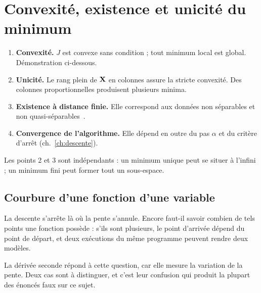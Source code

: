 \chapter{Convexité, existence et unicité du minimum}
\label{ann:convexite}


\begin{resultat}
\begin{enumerate}
  \item \textbf{Convexité.} $J$ est convexe sans condition ; tout minimum local
        est global. Démonstration ci-dessous.
  \item \textbf{Unicité.} Le rang plein de $\mathbf{X}$ en colonnes assure la stricte
        convexité. Des colonnes proportionnelles produisent plusieurs minima.
  \item \textbf{Existence à distance finie.} Elle correspond aux données
        non séparables et non quasi-séparables~\cite{albert1984}.
  \item \textbf{Convergence de l'algorithme.} Elle dépend en outre du pas
        $\alpha$ et du critère d'arrêt (ch.~\ref{ch:descente}).
\end{enumerate}
Les points 2 et 3 sont indépendants : un minimum unique peut se situer à
l'infini ; un minimum fini peut former tout un sous-espace.
\end{resultat}

\section{Courbure d'une fonction d'une variable}

La descente s'arrête là où la pente s'annule. Encore faut-il savoir combien de
tels points une fonction possède : s'ils sont plusieurs, le point d'arrivée
dépend du point de départ, et deux exécutions du même programme peuvent rendre
deux modèles.

La dérivée seconde répond à cette question, car elle mesure la variation de la
pente. Deux cas sont à distinguer, et c'est leur confusion qui produit la plupart
des énoncés faux sur ce sujet.

